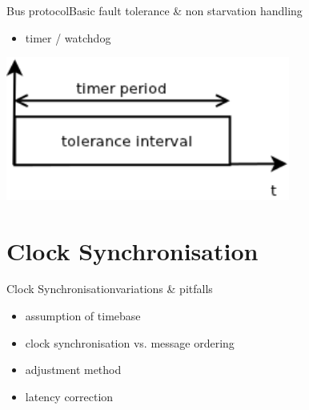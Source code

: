 \documentclass{beamer}
\begin{document}
\begin{frame}{Bus protocol}{Basic fault tolerance \& non starvation handling}
\begin{center}
\begin{itemize}
 \item \begin{large}timer / watchdog\end{large}
\end{itemize}
\begin{center}
\includegraphics[width=0.7\textwidth]{./images/faulttolerance.png}
\end{center}
\end{center}
\end{frame}

\section{Clock Synchronisation}
\begin{frame}{Clock Synchronisation}{variations \& pitfalls}
\begin{center}
\begin{itemize}
  \item \begin{large}assumption of timebase\end{large}
  \item \begin{large}clock synchronisation vs. message ordering\end{large}
  \item \begin{large}adjustment method\end{large}
  \item \begin{large}latency correction\end{large}
\end{itemize}
\end{center}
\end{frame}
\end{document}
